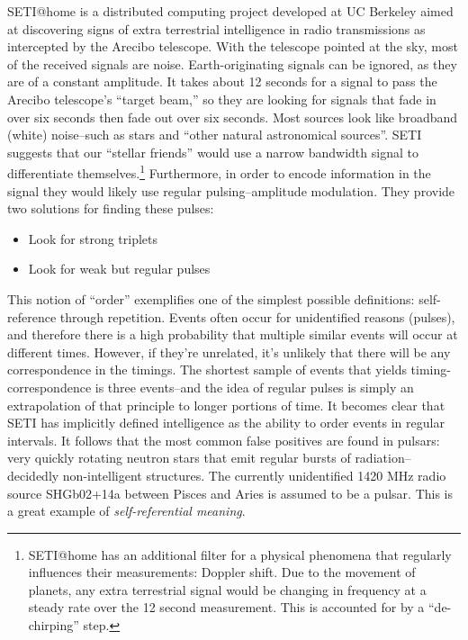 \documentclass{thesis}
\begin{document}
	SETI@home\cite{seti_about_????} is a distributed computing project developed at UC Berkeley aimed at discovering signs of extra terrestrial intelligence in radio transmissions as intercepted by the Arecibo telescope. With the telescope pointed at the sky, most of the received signals are noise. Earth-originating signals can be ignored, as they are of a constant amplitude. It takes about 12 seconds for a signal to pass the Arecibo telescope's ``target beam,'' so they are looking for signals that fade in over six seconds then fade out over six seconds. Most sources look like broadband (white) noise--such as stars and ``other natural astronomical sources''. SETI suggests that our ``stellar friends'' would use a narrow bandwidth signal to differentiate themselves.\footnote{SETI@home has an additional filter for a physical phenomena that regularly influences their measurements: Doppler shift. Due to the movement of planets, any extra terrestrial signal would be changing in frequency at a steady rate over the 12 second measurement. This is accounted for by a ``de-chirping'' step.} Furthermore, in order to encode information in the signal they would likely use regular pulsing--amplitude modulation. They provide two solutions for finding these pulses:
	
	\begin{itemize}
	\item Look for strong triplets
	\item Look for weak but regular pulses
	\end{itemize}
	
	This notion of ``order'' exemplifies one of the simplest possible definitions: self-reference through repetition. Events often occur for unidentified reasons (pulses), and therefore there is a high probability that multiple similar events will occur at different times. However, if they're unrelated, it's unlikely that there will be any correspondence in the timings. The shortest sample of events that yields timing-correspondence is three events--and the idea of regular pulses is simply an extrapolation of that principle to longer portions of time. It becomes clear that SETI has implicitly defined intelligence as the ability to order events in regular intervals. It follows that the most common false positives are found in pulsars: very quickly rotating neutron stars that emit regular bursts of radiation--decidedly non-intelligent structures. The currently unidentified 1420 MHz radio source SHGb02+14a between Pisces and Aries is assumed to be a pulsar.\cite{eugenie_samuel_reich_mysterious_2004} This is a great example of \emph{self-referential meaning}.
	
\end{document}
